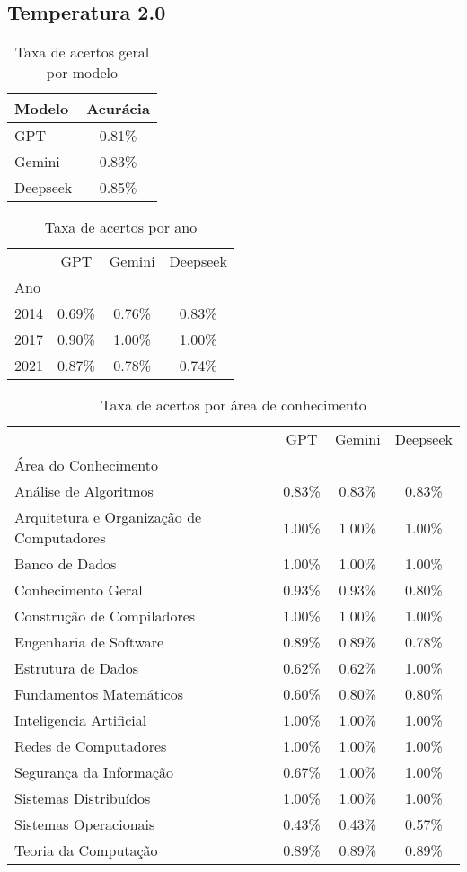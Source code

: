 \subsection{Temperatura 2.0}

\begin{table}[H]
\centering
\caption{Taxa de acertos geral por modelo}
\label{tab:acuracia_geral}
\begin{tabular}{l c}
\toprule
Modelo & Acurácia \\
\midrule
GPT & 0.81\% \\
Gemini & 0.83\% \\
Deepseek & 0.85\% \\
\bottomrule
\end{tabular}
\end{table}


\begin{table}[H]
\centering
\caption{Taxa de acertos por ano}
\label{tab:acuracia_ano}
\begin{tabular}{l c c c}
\toprule
 & GPT & Gemini & Deepseek \\
Ano &  &  &  \\
\midrule
2014 & 0.69\% & 0.76\% & 0.83\% \\
2017 & 0.90\% & 1.00\% & 1.00\% \\
2021 & 0.87\% & 0.78\% & 0.74\% \\
\bottomrule
\end{tabular}
\end{table}


\begin{table}[H]
\centering
\caption{Taxa de acertos por área de conhecimento}
\label{tab:acuracia_area}
\begin{tabular}{l c c c}
\toprule
 & GPT & Gemini & Deepseek \\
Área do Conhecimento &  &  &  \\
\midrule
Análise de Algoritmos & 0.83\% & 0.83\% & 0.83\% \\
Arquitetura e Organização de Computadores & 1.00\% & 1.00\% & 1.00\% \\
Banco de Dados & 1.00\% & 1.00\% & 1.00\% \\
Conhecimento Geral & 0.93\% & 0.93\% & 0.80\% \\
Construção de Compiladores & 1.00\% & 1.00\% & 1.00\% \\
Engenharia de Software & 0.89\% & 0.89\% & 0.78\% \\
Estrutura de Dados & 0.62\% & 0.62\% & 1.00\% \\
Fundamentos Matemáticos & 0.60\% & 0.80\% & 0.80\% \\
Inteligencia Artificial & 1.00\% & 1.00\% & 1.00\% \\
Redes de Computadores & 1.00\% & 1.00\% & 1.00\% \\
Segurança da Informação & 0.67\% & 1.00\% & 1.00\% \\
Sistemas Distribuídos & 1.00\% & 1.00\% & 1.00\% \\
Sistemas Operacionais & 0.43\% & 0.43\% & 0.57\% \\
Teoria da Computação & 0.89\% & 0.89\% & 0.89\% \\
\bottomrule
\end{tabular}
\end{table}
